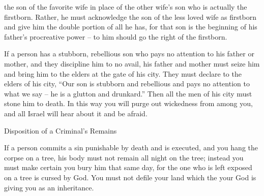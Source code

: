{the son
of the favorite
wife in place of the other wife’s son
who is actually the firstborn.
Rather,
he must acknowledge
the son
of the less
loved wife as firstborn
and give
him the double
portion of all
he has,
for that
son is the beginning
of his father’s procreative power –
to him should go the right
of the firstborn.
\par }{\PP {}If
a person
has a stubborn,
rebellious
son
who pays no
attention
to his father
or mother,
and they discipline
him to no
avail,
his father
and mother
must seize
him and bring
him to
the elders
at the gate
of his city.
They must declare
to
the elders
of his city,
“Our son
is
stubborn
and rebellious
and pays no
attention to what we say – he is a glutton and drunkard.”
Then
all
the men
of his city
must stone
him to death.
In this way you will purge
out wickedness
from among
you, and all
Israel
will hear
about it and be afraid.
\par }{\SH Disposition of a Criminal’s Remains
\par }{\PP {}If
a person
commits
a sin punishable by
death
and is executed,
and you hang
the corpse on
a tree,
his body
must not
remain all night
on
the tree;
instead
you must make certain you bury
him
that
same day,
for
the one who is left exposed
on a tree is cursed
by God.
You must not
defile
your land
which
the {}
your God
is giving
you as an inheritance.

}
